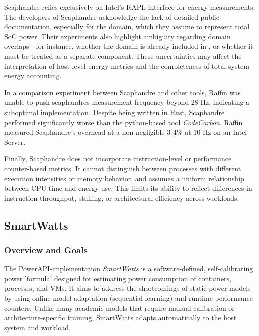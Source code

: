 Scaphandre relies exclusively on Intel’s RAPL interface for energy measurements. The developers of Scaphandre acknowledge the lack of detailed public documentation, especially for the  domain, which they assume to represent total SoC power. Their experiments also highlight ambiguity regarding domain overlaps—for instance, whether the  domain is already included in , or whether it must be treated as a separate component. These uncertainties may affect the interpretation of host-level energy metrics and the completeness of total system energy accounting.

In a comparison experiment between Scaphandre and other tools, Raffin\parencite{raffin2024dissecting} was unable to push scaphandres measurement frequency beyond 28 Hz, indicating a suboptimal implementation. Despite being written in Rust, Scaphandre performed significantly worse than the python-based tool \textit{CodeCarbon}. Raffin measured Scaphandre's overhead at a non-negligible 3-4\% at 10 Hz on an Intel Server.

Finally, Scaphandre does not incorporate instruction-level or performance counter-based metrics. It cannot distinguish between processes with different execution intensities or memory behavior, and assumes a uniform relationship between CPU time and energy use. This limits its ability to reflect differences in instruction throughput, stalling, or architectural efficiency across workloads.

\subsection{SmartWatts}
\label{sec:smartwatts}
\subsubsection{Overview and Goals}
\label{sec:smartwatts-overview}
The PowerAPI-implementation \textit{SmartWatts}\parencite{fieni2020smartwatts} is a software-defined, self-calibrating power 'formula' designed for estimating power consumption of containers, processes, and VMs. It aims to address the shortcomings of static power models by using online model adaptation (sequential learning) and runtime performance counters. Unlike many academic models that require manual calibration or architecture-specific training, SmartWatts adapts automatically to the host system and workload.
